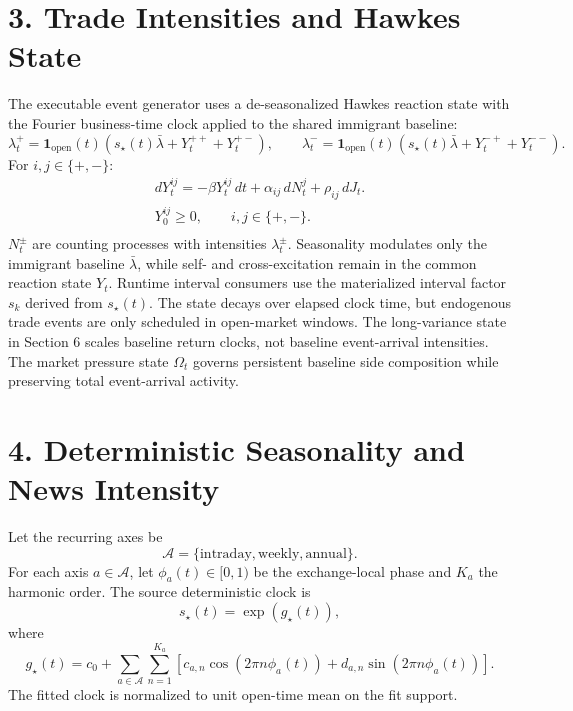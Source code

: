\documentclass[11pt]{article}
\begin{document}
    \section*{3. Trade Intensities and Hawkes State}
    The executable event generator uses a de-seasonalized Hawkes reaction
    state with the Fourier business-time clock applied to the shared immigrant
    baseline:
    \[
        \lambda_t^+ = \mathbf{1}_{\mathrm{open}}(t)
        \left(s_\star(t)\bar{\lambda} + Y_t^{++} + Y_t^{+-}\right),
        \qquad
        \lambda_t^- = \mathbf{1}_{\mathrm{open}}(t)
        \left(s_\star(t)\bar{\lambda} + Y_t^{-+} + Y_t^{--}\right).
    \]
    For \(i,j\in\{+,-\}\):
    \begin{gather*}
        dY_t^{ij} = -\beta Y_t^{ij}\,dt + \alpha_{ij}\,dN_t^{j} + \rho_{ij}\,dJ_t.\\
        Y_0^{ij}\ge 0,\qquad i,j\in\{+,-\}.\\
    \end{gather*}
    \(N_t^\pm\) are counting processes with intensities \(\lambda_t^\pm\).
    Seasonality modulates only the immigrant baseline \( \bar{\lambda} \), while
    self- and cross-excitation remain in the common reaction state \(Y_t\).
    Runtime interval consumers use the materialized interval factor \(s_k\)
    derived from \(s_\star(t)\).
    The state decays over elapsed clock time, but endogenous trade events are
    only scheduled in open-market windows.
    The long-variance state in Section 6 scales baseline return clocks, not
    baseline event-arrival intensities.
    The market pressure state \(\Omega_t\) governs persistent baseline side
    composition while preserving total event-arrival activity.

    \section*{4. Deterministic Seasonality and News Intensity}
    Let the recurring axes be
    \[
        \mathcal A
        =
        \{\mathrm{intraday},\mathrm{weekly},\mathrm{annual}\}.
    \]
    For each axis \(a\in\mathcal A\), let \(\phi_a(t)\in[0,1)\) be the
    exchange-local phase and \(K_a\) the harmonic order.
    The source deterministic clock is
    \[
        s_\star(t)=\exp(g_\star(t)),
    \]
    where
    \[
        g_\star(t)
        =
        c_0
        +
        \sum_{a\in\mathcal A}
        \sum_{n=1}^{K_a}
        \left[
            c_{a,n}\cos(2\pi n\phi_a(t))
            +
            d_{a,n}\sin(2\pi n\phi_a(t))
        \right].
    \]
    The fitted clock is normalized to unit open-time mean on the fit support.
\end{document}
